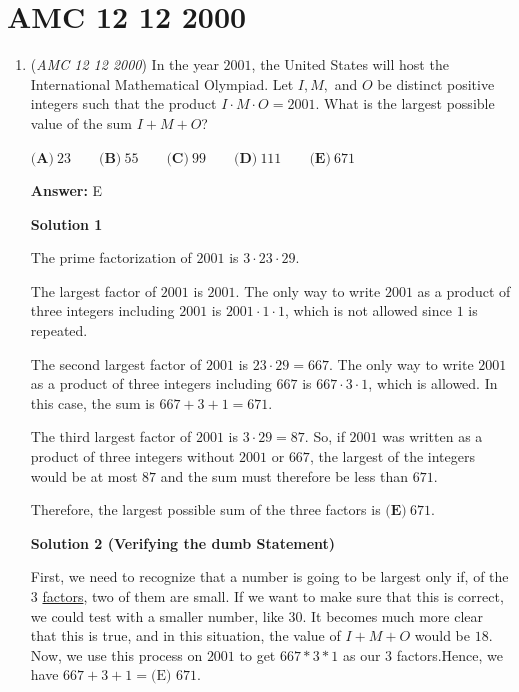 \section{AMC 12 12 2000}
        \begin{enumerate}
        	\item (\textit{AMC 12 12 2000}) In the year $2001$, the United States will host the International Mathematical Olympiad. Let $I,M,$ and $O$ be distinct positive integers such that the product $I \cdot M \cdot O = 2001$. What is the largest possible value of the sum $I + M + O$?


 $\textbf{(A)}\ 23 \qquad \textbf{(B)}\ 55 \qquad \textbf{(C)}\ 99 \qquad \textbf{(D)}\ 111 \qquad \textbf{(E)}\ 671$

 \textbf{Answer: }E



\textbf{Solution 1}

The prime factorization of $2001$ is $3 \cdot 23 \cdot 29$.  

 The largest factor of $2001$ is $2001$.  The only way to write $2001$ as a product of three integers including $2001$ is $2001 \cdot 1 \cdot 1$, which is not allowed since $1$ is repeated.

 The second largest factor of $2001$ is $23 \cdot 29 = 667$.  The only way to write $2001$ as a product of three integers including $667$ is $667 \cdot 3 \cdot 1$, which is allowed.  In this case, the sum is $667 + 3 + 1 = 671$.

 The third largest factor of $2001$ is $3 \cdot 29 = 87$.  So, if $2001$ was written as a product of three integers without $2001$ or $667$, the largest of the integers would be at most $87$ and the sum must therefore be less than $671$.

 Therefore, the largest possible sum of the three factors is $\boxed{\textbf{(E)}\ 671}$.

 



\textbf{Solution 2 (Verifying the dumb Statement)}

First, we need to recognize that a number is going to be largest only if, of the $3$ \href{https://artofproblemsolving.com/wiki/index.php?title=Factor}{factors}, two of them are small. If we want to make sure that this is correct, we could test with a smaller number, like $30$. It becomes much more clear that this is true, and in this situation, the value of $I + M + O$ would be $18$. Now, we use this process on $2001$ to get $667 * 3 * 1$ as our $3$ factors.Hence, we have $667 + 3 + 1 = \boxed{\text{(E) 671.}}$





\end{enumerate}
